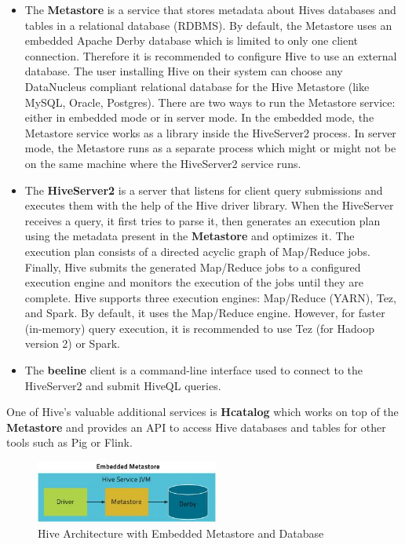 \documentclass[12pt,english]{book}
\begin{document}
\begin{itemize}

\item
The \textbf{Metastore} is a service that stores metadata about Hives databases and tables in a relational database (RDBMS).
By default, the Metastore uses an embedded Apache Derby database
which is limited to only one client connection.
Therefore it is recommended to configure Hive to use an external database.
The user installing Hive on their system can choose any DataNucleus compliant relational database for the Hive Metastore (like MySQL, Oracle, Postgres).
There are two ways to run the Metastore service: either in embedded mode or in server mode.
In the embedded mode, the Metastore service works as a library inside the HiveServer2 process.
In server mode, the Metastore runs as a separate process which might or might not be on the same machine where the HiveServer2 service runs.

\item
The \textbf{HiveServer2} is a server that listens for client query submissions and executes them with the help of the Hive driver library.
When the HiveServer receives a query, it first tries to parse it, then generates an execution plan using the metadata present in the \textbf{Metastore} and optimizes it.
The execution plan consists of a directed acyclic graph of Map/Reduce jobs.
Finally, Hive submits the generated Map/Reduce jobs to a configured execution engine and monitors the execution of the jobs until they are complete.
Hive supports three execution engines: Map/Reduce (YARN), Tez, and Spark.
By default, it uses the Map/Reduce engine.
However, for faster (in-memory) query execution, it is recommended to use Tez (for Hadoop version 2) or Spark.

\item
The \textbf{beeline} client is a command-line interface used to connect to the HiveServer2 and submit HiveQL queries.

\end{itemize}

One of Hive's valuable additional services is \textbf{Hcatalog} which works on top of the \textbf{Metastore} and provides an API to access Hive databases and tables for other tools such as Pig or Flink.

\begin{figure}[H]
	\centering
	\includegraphics[width=6cm]{hiveEmbeddedMetaStore.png}
	\caption[Hive Architecture with Embedded Metastore and Database]{Hive Architecture with Embedded Metastore and Database\footnotemark}
\end{figure}
\end{document}
